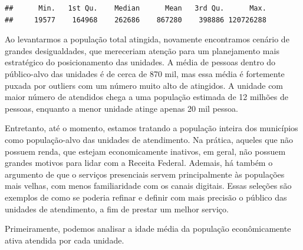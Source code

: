 \documentclass[]{article}
\newenvironment{Shaded}{\begin{snugshade}}{\end{snugshade}}
\newcommand{\KeywordTok}[1]{\textcolor[rgb]{0.13,0.29,0.53}{\textbf{#1}}}
\newcommand{\NormalTok}[1]{#1}
\newcommand{\OperatorTok}[1]{\textcolor[rgb]{0.81,0.36,0.00}{\textbf{#1}}}
\begin{document}
\begin{Shaded}
\end{Shaded}

\begin{verbatim}
##      Min.   1st Qu.    Median      Mean   3rd Qu.      Max. 
##     19577    164968    262686    867280    398886 120726288
\end{verbatim}

Ao levantarmos a população total atingida, novamente encontramos cenário
de grandes desigualdades, que mereceriam atenção para um planejamento
mais estratégico do posicionamento das unidades. A média de pessoas
dentro do público-alvo das unidades é de cerca de 870 mil, mas essa
média é fortemente puxada por outliers com um número muito alto de
atingidos. A unidade com maior número de atendidos chega a uma população
estimada de 12 milhões de pessoas, enquanto a menor unidade atinge
apenas 20 mil pessoa.

Entretanto, até o momento, estamos tratando a população inteira dos
municípios como população-alvo das unidades de atendimento. Na prática,
aqueles que não possuem renda, que estejam economicamente inativos, em
geral, não possuem grandes motivos para lidar com a Receita Federal.
Ademais, há também o argumento de que o serviços presenciais servem
principalmente às populações mais velhas, com menos familiaridade com os
canais digitais. Essas seleções são exemplos de como se poderia refinar
e definir com mais precisão o público das unidades de atendimento, a fim
de prestar um melhor serviço.

Primeiramente, podemos analisar a idade média da população
econômicamente ativa atendida por cada unidade.
\end{document}
